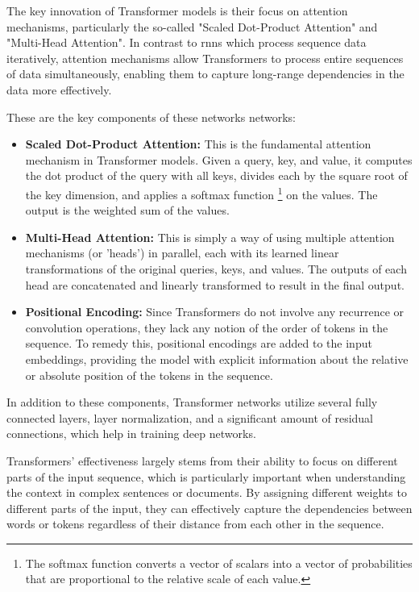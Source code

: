 The key innovation of Transformer models is their focus on attention
mechanisms, particularly the so-called "Scaled Dot-Product Attention" and
"Multi-Head Attention". In contrast to \glspl{rnn} which process sequence data
iteratively, attention mechanisms allow Transformers to process entire
sequences of data simultaneously, enabling them to capture long-range
dependencies in the data more effectively.

These are the key components of these networks networks:

\begin{itemize}
    \item \textbf{Scaled Dot-Product Attention:} This is the fundamental attention
          mechanism in Transformer models. Given a query, key, and value, it computes
          the dot product of the query with all keys, divides each by the square root
          of the key dimension, and applies a softmax function
          \footnote{The softmax function converts a vector of scalars into a
              vector of probabilities that are proportional to the relative scale
              of each value.} on the values.
          The output is the weighted sum of the values.

    \item \textbf{Multi-Head Attention:} This is simply a way of using multiple
          attention mechanisms (or 'heads') in parallel, each with its learned linear
          transformations of the original queries, keys, and values. The outputs of
          each head are concatenated and linearly transformed to result in the final output.

    \item \textbf{Positional Encoding:} Since Transformers do not involve any
          recurrence or convolution operations, they lack any notion of the order of
          tokens in the sequence. To remedy this, positional encodings are added to
          the input embeddings, providing the model with explicit information about
          the relative or absolute position of the tokens in the sequence.
\end{itemize}

In addition to these components, Transformer networks utilize several fully
connected layers, layer normalization, and a significant amount of residual
connections, which help in training deep networks.

Transformers' effectiveness largely stems from their ability to focus on
different parts of the input sequence, which is particularly important when
understanding the context in complex sentences or documents. By assigning
different weights to different parts of the input, they can effectively capture
the dependencies between words or tokens regardless of their distance from each
other in the sequence.

